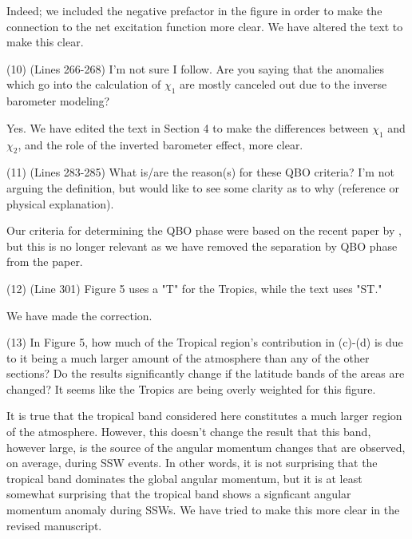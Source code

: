 \documentclass[a4paper,10pt]{article}
\begin{document}
Indeed; we included the negative prefactor in the figure in order to make the connection to the net excitation function more clear.
We have altered the text to make this clear.
\vspace{0.5cm}


\noindent \textcolor{reviewer}{(10) (Lines 266-268) I'm not sure I follow. Are you saying that the anomalies which go into the calculation of $\chi_1$ are mostly canceled out due to the inverse barometer modeling?}
\vspace{0.5cm}

Yes.  We have edited the text in Section 4 to make the differences between $\chi_1$ and $\chi_2$, and the role of the inverted barometer effect, more clear.
\vspace{0.5cm}

\noindent \textcolor{reviewer}{(11) (Lines 283-285) What is/are the reason(s) for these QBO criteria? I'm not arguing the definition, but would like to see some clarity as to why (reference or physical explanation).}
\vspace{0.5cm}

Our criteria for determining the QBO phase were based on the recent paper by \citet{Hansen2013}, but this is no longer relevant as we have removed the separation by QBO phase from the paper.
\vspace{0.5cm}


\noindent \textcolor{reviewer}{(12) (Line 301) Figure 5 uses a "T" for the Tropics, while the text uses "ST."}
\vspace{0.5cm}

We have made the correction.
\vspace{0.5cm}

\noindent \textcolor{reviewer}{(13) In Figure 5, how much of the Tropical region's contribution in (c)-(d) is due to it being a much larger amount of the atmosphere than any of the other sections? Do the results significantly change if the latitude bands of the areas are changed? It seems like the Tropics are being overly weighted for this figure.}
\vspace{0.5cm}

It is true that the tropical band considered here constitutes a much larger region of the atmosphere. 
However, this doesn't change the result that this band, however large, is the source of the angular momentum changes that are observed, on average, during SSW events. 
In other words, it is not surprising that the tropical band dominates the global angular momentum, but it is at least somewhat surprising that the tropical band shows a signficant angular momentum anomaly during SSWs.  
We have tried to make this more clear in the revised manuscript.
\vspace{0.5cm}
\end{document}
